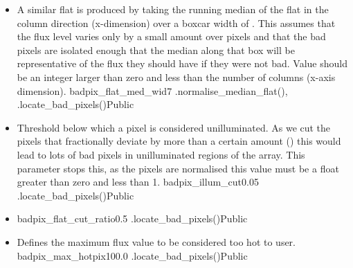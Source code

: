 \begin{itemize}

	\item {} 
	{A similar flat is produced by taking the running median of the flat in the column direction (x-dimension) over a boxcar width of . This assumes that the flux level varies only by a small amount over  pixels and that the bad pixels are isolated enough that the median along that box will be representative of the flux they should have if they were not bad. Value should be an integer larger than zero and less than the number of columns (x-axis dimension).}
	{badpix\_flat\_med\_wid}{7}
	{\calbadpix}{\constantsfile}{\spirouImage.normalise\_median\_flat(), \spirouImage.locate\_bad\_pixels()}{Public}

	\item {}
	{Threshold below which a pixel is considered unilluminated. As we cut the pixels that fractionally deviate by more than a certain amount () this would lead to lots of bad pixels in unilluminated regions of the array. This parameter stops this, as the pixels are normalised this value must be a float greater than zero and less than 1.}
	{badpix\_illum\_cut}{0.05}
	{\calbadpix}{\constantsfile}{\spirouImage.locate\_bad\_pixels()}{Public}

	\item {} 
	{badpix\_flat\_cut\_ratio}{0.5}
	{\calbadpix}{\constantsfile}{\spirouImage.locate\_bad\_pixels()}{Public}

	\item {}
	{Defines the maximum flux value to be considered too hot to user.}
	{badpix\_max\_hotpix}{100.0}
	{\calbadpix}{\constantsfile}{\spirouImage.locate\_bad\_pixels()}{Public}

\end{itemize}









